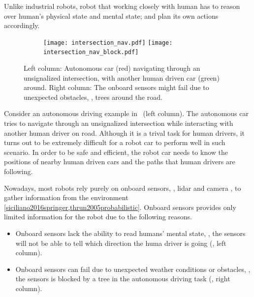 \documentclass{article}
\begin{document}
Unlike industrial robots,
robot that working closely with human has to 
reason over human's 
physical state and mental state;
and plan its own actions accordingly.

\begin{figure}[!h]
    \centering
    \begin{subfigure}{1.0\linewidth}
        \centering
        \texttt{[image: intersection\_nav.pdf]}
        \hspace{1.5cm}
        \texttt{[image: intersection\_nav\_block.pdf]}
    \end{subfigure}
    \caption{Left column:
        Autonomous car (red) navigating through an unsignalized 
        intersection, with another human driven car (green) around. 
        Right column:
        The onboard sensors might fail due to unexpected obstacles,
        \eg, trees around the road.
    }
    \label{fig:intersection_nav}
\end{figure}


Consider an autonomous driving example in~ (left column).
The autonomous car tries to navigate through an unsignalized intersection
while interacting with another human driver on road. 
Although it is a trival task for human drivers, it
turns out to be extremely difficult for a robot car to perform 
well in such scenario. 
In order to be safe and efficient, 
the robot car needs to 
know the positions of nearby human driven cars and the paths that 
human drivers are following.


Nowadays, most robots rely purely on onboard sensors,
\eg, lidar and camera \etc,
to gather information from the environment
\cref{siciliano2016springer,thrun2005probabilistic}. 
Onboard sensors provides only limited information for the
robot due to the following reasons.
\begin{itemize}
    \item Onboard sensors lack the ability to read humans' mental 
        state, \eg, the sensors will not be able to tell 
        which direction the huma driver is going
        (, left column).
    \item Onboard sensors can fail due to unexpected weather
        conditions or obstacles, \eg, the sensors is blocked
        by a tree in the autonomous driving task
        (, right column).
\end{itemize}
\end{document}
